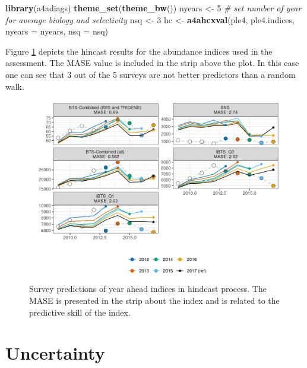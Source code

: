 \documentclass[
]{book}
\newenvironment{Shaded}{\begin{snugshade}}{\end{snugshade}}
\newcommand{\AttributeTok}[1]{\textcolor[rgb]{0.13,0.29,0.53}{#1}}
\newcommand{\CommentTok}[1]{\textcolor[rgb]{0.56,0.35,0.01}{\textit{#1}}}
\newcommand{\DecValTok}[1]{\textcolor[rgb]{0.00,0.00,0.81}{#1}}
\newcommand{\FunctionTok}[1]{\textcolor[rgb]{0.13,0.29,0.53}{\textbf{#1}}}
\newcommand{\NormalTok}[1]{#1}
\newcommand{\OtherTok}[1]{\textcolor[rgb]{0.56,0.35,0.01}{#1}}
\begin{document}
\begin{Shaded}
\begin{Highlighting}[]
\FunctionTok{library}\NormalTok{(a4adiags)}
\FunctionTok{theme\_set}\NormalTok{(}\FunctionTok{theme\_bw}\NormalTok{())}
\NormalTok{nyears }\OtherTok{\textless{}{-}} \DecValTok{5}
\CommentTok{\# set number of year for average biology and selectivity}
\NormalTok{nsq }\OtherTok{\textless{}{-}} \DecValTok{3}
\NormalTok{hc }\OtherTok{\textless{}{-}} \FunctionTok{a4ahcxval}\NormalTok{(ple4, ple4.indices, }\AttributeTok{nyears =}\NormalTok{ nyears, }\AttributeTok{nsq =}\NormalTok{ nsq)}
\end{Highlighting}
\end{Shaded}

Figure \ref{fig:hc} depicts the hincast results for the abundance indices used in the assessment. The MASE value is included in the strip above the plot. In this case one can see that 3 out of the 5 surveys are not better predictors than a random walk.

\begin{figure}
\centering
\includegraphics{_bookdown_files/_main_files/figure-html/hc-1.png}
\caption{\label{fig:hc}Survey predictions of year ahead indices in hindcast process. The MASE is presented in the strip about the index and is related to the predictive skill of the index.}
\end{figure}

\hypertarget{uncertainty}{%
\chapter{\texorpdfstring{Uncertainty \label{sec:predsim}}{Uncertainty }}\label{uncertainty}}
\end{document}
